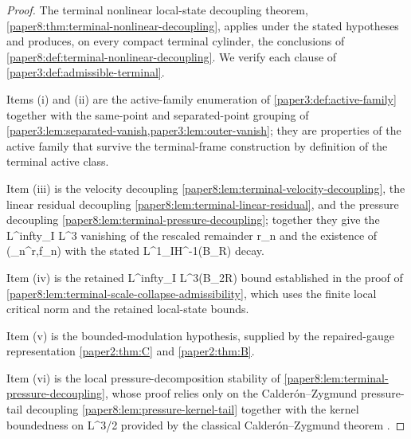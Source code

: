 \documentclass[11pt]{amsart}
\def\({}%
\def\){}%
\def\infty{infty}%
\theoremstyle{plain}
\theoremstyle{definition}
\theoremstyle{remark}
\begin{document}
\begin{proof}
The terminal nonlinear local-state decoupling theorem,
\cref{paper8:thm:terminal-nonlinear-decoupling}, applies under the stated
hypotheses and produces, on every compact terminal cylinder, the conclusions
of \cref{paper8:def:terminal-nonlinear-decoupling}.  We verify each clause of
\cref{paper3:def:admissible-terminal}.

Items (i) and (ii) are the active-family enumeration of
\cref{paper3:def:active-family} together with the same-point and
separated-point grouping of \cref{paper3:lem:separated-vanish,paper3:lem:outer-vanish};
they are properties of the active family that survive the terminal-frame
construction by definition of the terminal active class.

Item (iii) is the velocity decoupling
\cref{paper8:lem:terminal-velocity-decoupling}, the linear residual decoupling
\cref{paper8:lem:terminal-linear-residual}, and the pressure decoupling
\cref{paper8:lem:terminal-pressure-decoupling}; together they give the
\(L^\infty_I L^3\) vanishing of the rescaled remainder \(r_n\) and the
existence of \((\pi_n^r,f_n)\) with the stated \(L^1_IH^{-1}(B_R)\) decay.

Item (iv) is the retained \(L^\infty_I L^3(B_{2R})\) bound established in the
proof of \cref{paper8:lem:terminal-scale-collapse-admissibility}, which uses
the finite local critical norm and the retained local-state bounds.

Item (v) is the bounded-modulation hypothesis, supplied by the repaired-gauge
representation \cref{paper2:thm:C} and \cref{paper2:thm:B}.

Item (vi) is the local pressure-decomposition stability of
\cref{paper8:lem:terminal-pressure-decoupling}, whose proof relies only on the
Calder\'on--Zygmund pressure-tail decoupling
\cref{paper8:lem:pressure-kernel-tail} together with the kernel boundedness on
\(L^{3/2}\) provided by the classical Calder\'on--Zygmund theorem
\cite{CalderonZygmund1952,Stein1970}.


\end{proof}
\end{document}
